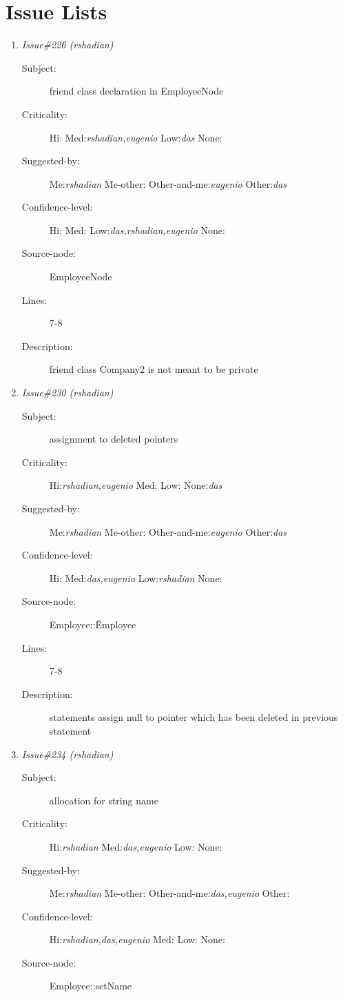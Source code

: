 \section{Issue Lists}
\begin{enumerate}
\item {\it Issue\#226 (rshadian)}
\begin{description}
\item [Subject:] friend class declaration in EmployeeNode
\item [Criticality:] Hi:{\it } Med:{\it rshadian,eugenio} Low:{\it das} None:{\it }
\item [Suggested-by:] Me:{\it rshadian} Me-other:{\it } Other-and-me:{\it eugenio} Other:{\it das}
\item [Confidence-level:] Hi:{\it } Med:{\it } Low:{\it das,rshadian,eugenio} None:{\it }
\item [Source-node:] EmployeeNode

\item [Lines:] 7-8

\item [Description:] friend class Company2 is not meant to be private
\end{description}
\item {\it Issue\#230 (rshadian)}
\begin{description}
\item [Subject:] assignment to deleted pointers
\item [Criticality:] Hi:{\it rshadian,eugenio} Med:{\it } Low:{\it } None:{\it das}
\item [Suggested-by:] Me:{\it rshadian} Me-other:{\it } Other-and-me:{\it eugenio} Other:{\it das}
\item [Confidence-level:] Hi:{\it } Med:{\it das,eugenio} Low:{\it rshadian} None:{\it }
\item [Source-node:] Employee::\~Employee

\item [Lines:] 7-8

\item [Description:] statements assign null to pointer which has
been deleted in previous statement
\end{description}
\item {\it Issue\#234 (rshadian)}
\begin{description}
\item [Subject:] allocation for string name
\item [Criticality:] Hi:{\it rshadian} Med:{\it das,eugenio} Low:{\it } None:{\it }
\item [Suggested-by:] Me:{\it rshadian} Me-other:{\it } Other-and-me:{\it das,eugenio} Other:{\it }
\item [Confidence-level:] Hi:{\it rshadian,das,eugenio} Med:{\it } Low:{\it } None:{\it }
\item [Source-node:] Employee::setName


\end{description}
\end{enumerate}
